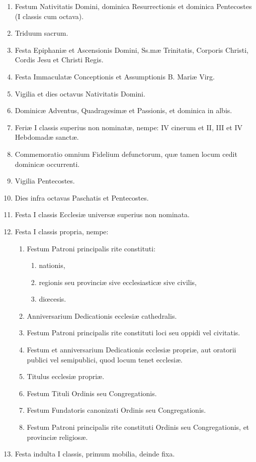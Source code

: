 \documentclass[vesperale_romanum.tex]{subfiles}
\begin{document}
 \begin{enumerate}[nosep]
\item
Festum Nativitatis Domini, dominica Resurrectionis et dominica Pentecostes (I classis cum octava).
\item Triduum sacrum.
\item Festa Epiphaniæ et Ascensionis Domini, Ss.mæ Trinitatis, Corporis Christi, Cordis Jesu et Christi Regis.
\item Festa Immaculatæ Conceptionis et Assumptionis B. Mariæ Virg.
\item Vigilia et dies octavus Nativitatis Domini.
\item
 Dominicæ Adventus, Quadragesimæ et Passionis, et dominica in albis.
\item
Feriæ I classis superius non nominatæ, nempe: IV cinerum et II, III et IV Hebdomadæ sanctæ.
\item
Commemoratio omnium Fidelium defun\-ctorum, quæ tamen locum cedit dominicæ occurrenti.
\item
Vigilia Pentecostes.
\item
Dies infra octavas Paschatis et Pentecostes.
\item
Festa I classis Ecclesiæ universæ superius non nominata.
\item
Festa I classis propria, nempe:
\begin{enumerate}[nosep,label=\arabic*.]
\item
Festum Patroni principalis rite constituti:
\begin{enumerate}[nosep,label=\alph*.]
\item
nationis,
\item
 regionis seu provinciæ sive ecclesiasticæ sive civilis,
\item
diœcesis.
\end{enumerate}
\item
Anniversarium Dedicationis ecclesiæ cathedralis.
\item
Festum Patroni principalis rite constituti loci seu oppidi vel civitatis.
\item
Festum et anniversarium Dedicationis ecclesiæ propriæ, aut oratorii publici vel semipublici, quod locum tenet ecclesiæ.
\item
Titulus ecclesiæ propriæ.
\item
Festum Tituli Ordinis seu Congregationis.
\item
Festum Fundatoris canonizati Ordinis seu Congregationis.
\item
Festum Patroni principalis rite constituti Ordinis seu Congregationis, et provinciæ religiosæ.
\end{enumerate}
\item
Festa indulta I classis, primum mobilia, deinde fixa.
\end{enumerate}
\end{document}
